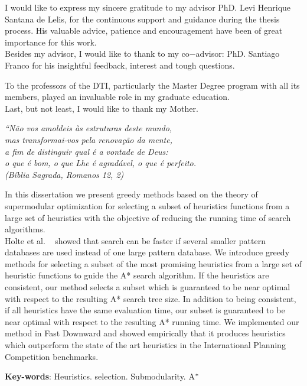 \documentclass[
	12pt,				%
	openright,		nsubseteq	%
	twoside,			%
	a4paper,			%
	english,			%
	french,				%
	spanish,			%
	brazil				%
	]{abntex2}
\providecommand{\shortcite}[1]{\cite{#1}}
\begin{document}
\begin{agradecimentos}
I would like to express my sincere gratitude to my advisor PhD. Levi Henrique Santana de Lelis, for the continuous support and guidance during the thesis process. His valuable advice, patience and encouragement have been of great
importance for this work. \\

Besides my advisor, I would like to thank to my co$-$advisor: PhD. Santiago Franco for his insightful feedback, interest and tough questions.

To the professors of the DTI, particularly the Master Degree program with all its members, played an invaluable role in my graduate education. \\

Last, but not least, I would like to thank my Mother.
\end{agradecimentos}

\begin{epigrafe}
    \vspace*{\fill}
	\begin{flushright}
		\textit{``Não vos amoldeis às estruturas deste mundo, \\
		mas transformai-vos pela renovação da mente, \\
		a fim de distinguir qual é a vontade de Deus: \\
		o que é bom, o que Lhe é agradável, o que é perfeito.\\
		(Bíblia Sagrada, Romanos 12, 2)}
	\end{flushright}
\end{epigrafe}


\setlength{\absparsep}{18pt} %
\begin{resumo}
In this dissertation we present greedy methods based on the theory of supermodular optimization for selecting a subset of heuristics functions from a large set of heuristics with the objective of reducing the running time of search algorithms. \\ 

Holte et al. ~\shortcite{holte2006maximizing} showed that search can be faster if several smaller pattern databases are used instead of one large pattern database. We introduce greedy methods for selecting a subset of the most promising heuristics from a large set of heuristic functions to guide the A* search algorithm. If the heuristics are consistent, our method selects a subset which is guaranteed to be near optimal with respect to the resulting A* search tree size. In addition to being consistent, if all heuristics have the same evaluation time, our subset is guaranteed to be near optimal with respect to the resulting A* running time. We implemented our method in Fast Downward and showed empirically that it produces heuristics which outperform the state of the art heuristics in the International Planning Competition benchmarks.

 \textbf{Key-words}: Heuristics. selection. Submodularity. A$\sp{*}$
\end{resumo}
\end{document}
